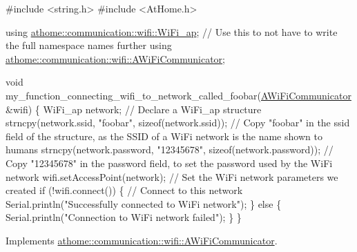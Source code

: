 \begin{DoxyCode}
\textcolor{preprocessor}{#include <string.h>}
\textcolor{preprocessor}{#include <AtHome.h>}

\textcolor{keyword}{using} \mbox{\hyperlink{structathome_1_1communication_1_1wifi_1_1s__wifi__access__point}{athome::communication::wifi::WiFi\_ap}}; \textcolor{comment}{// Use this to not have to
       write the full namespace names further}
\textcolor{keyword}{using} \mbox{\hyperlink{classathome_1_1communication_1_1wifi_1_1_a_wi_fi_communicator}{athome::communication::wifi::AWiFiCommunicator}};

\textcolor{keywordtype}{void} my\_function\_connecting\_wifi\_to\_network\_called\_foobar(\mbox{\hyperlink{classathome_1_1communication_1_1wifi_1_1_a_wi_fi_communicator_a0098148fe8d0eeee99b7f8f72a72a900}{AWiFiCommunicator}} &wifi) \{
  WiFi\_ap network; \textcolor{comment}{// Declare a WiFi\_ap structure}
  strncpy(network.ssid, \textcolor{stringliteral}{"foobar"}, \textcolor{keyword}{sizeof}(network.ssid)); \textcolor{comment}{// Copy "foobar" in the ssid field of the
       structure, as the SSID of a WiFi network is the name shown to humans}
  strncpy(network.password, \textcolor{stringliteral}{"12345678"}, \textcolor{keyword}{sizeof}(network.password)); \textcolor{comment}{// Copy "12345678" in the password
       field, to set the password used by the WiFi network}
  wifi.setAccessPoint(network); \textcolor{comment}{// Set the WiFi network parameters we created}
  \textcolor{keywordflow}{if} (!wifi.connect()) \{ \textcolor{comment}{// Connect to this network}
    Serial.println(\textcolor{stringliteral}{"Successfully connected to WiFi network"});
  \} \textcolor{keywordflow}{else} \{
    Serial.println(\textcolor{stringliteral}{"Connection to WiFi network failed"});
  \}
\}
\end{DoxyCode}
 

Implements \mbox{\hyperlink{classathome_1_1communication_1_1wifi_1_1_a_wi_fi_communicator_a309927109fbc19aa0fb2afb71d50bbf9}{athome\+::communication\+::wifi\+::\+A\+Wi\+Fi\+Communicator}}.

\mbox{\label{classathome_1_1communication_1_1wifi_1_1_native_arduino_e_s_p_wi_fi_communicator_ab3f6a0e1b9d3be98a876f95dde97976b}} 
